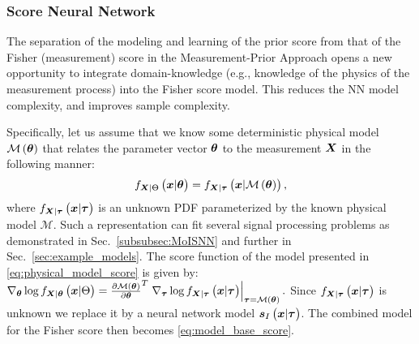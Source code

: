 \subsubsection{\pe{} Score Neural Network}\label{sec:model_informed}
{The separation of the modeling and learning of the prior score from that of the Fisher (measurement) score in the Measurement-Prior Approach opens a new opportunity to} integrate domain-knowledge (e.g., knowledge of the physics of the measurement process) into the {Fisher score model. This reduces the NN model complexity, and improves sample complexity.}  




{Specifically, } let us assume that we know some deterministic physical model $\mathcal{M}\left(\bm{\theta}\right)$ that relates the parameter vector $\bm{\theta}$ to the measurement $\X$ %
{in the following manner}:
\begin{equation}\label{eq:physical_model_score}
    \probt{{\x}|\p}{{\X}|\pr}=\probt{{\x}|\mathcal{M}\brackets{\p}}{{\X}|\vectorsym{\tau}},
\end{equation}
where $\probt{{\x}|\vectorsym{\tau}}{{\X}|\vectorsym{\tau}}$ is an unknown PDF %
parameterized by the known physical model $\mathcal{M}$. %
{%
Such a representation can fit several signal processing problems as demonstrated in {Sec.~\ref{subsubsec:MoISNN} and further} in Sec.~\ref{sec:example_models}. }
The score function of the model presented in \eqref{eq:physical_model_score} is given by:
    $\nabla_{\p}\log\probt{{\x}|\pr}{{\X}|\p}=\divc{\mathcal{M}\brackets{\p}}{\p}^T\at{\nabla_{\vectorsym{\tau}}\log\probt{{\x}|\vectorsym{\tau}}{{\X}|\vectorsym{\tau}}}{\vectorsym{\tau}=\mathcal{M}\brackets{\p}}.$
Since $\probt{{\x}|\vectorsym{\tau}}{{\X}|\vectorsym{\tau}}$ is unknown we replace it %
by a neural network model $\bm{s}_{I}\left(\bm{x}|\bm{\tau}\right)$.  {The combined model for the Fisher score then becomes} \eqref{eq:model_base_score}.
